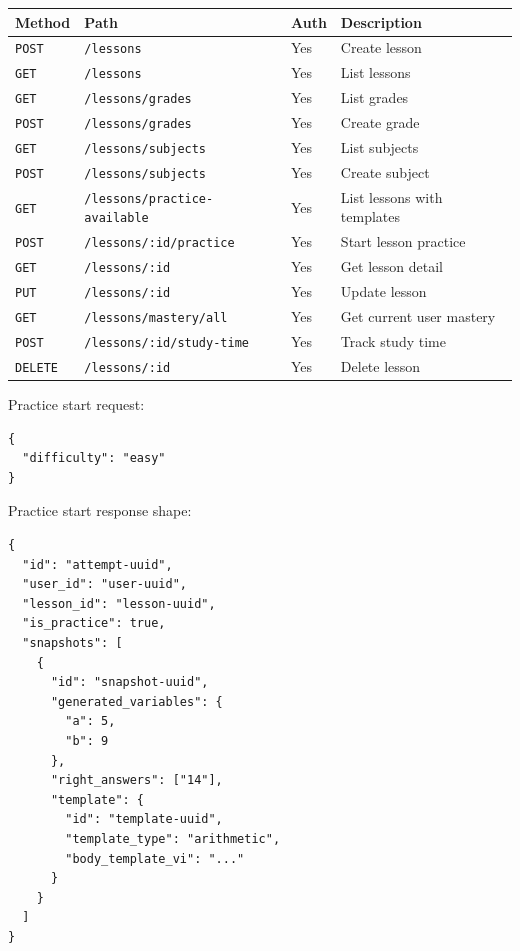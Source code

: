 \documentclass[11pt,a4paper]{article}
\newcommand{\docpath}[1]{\texttt{#1}}
\begin{document}
\begin{longtable}{L{0.12\textwidth}L{0.31\textwidth}L{0.12\textwidth}L{0.35\textwidth}}
\toprule
\textbf{Method} & \textbf{Path} & \textbf{Auth} & \textbf{Description} \\
\midrule
\endhead
\docpath{POST} & \docpath{/lessons} & Yes & Create lesson \\
\docpath{GET} & \docpath{/lessons} & Yes & List lessons \\
\docpath{GET} & \docpath{/lessons/grades} & Yes & List grades \\
\docpath{POST} & \docpath{/lessons/grades} & Yes & Create grade \\
\docpath{GET} & \docpath{/lessons/subjects} & Yes & List subjects \\
\docpath{POST} & \docpath{/lessons/subjects} & Yes & Create subject \\
\docpath{GET} & \docpath{/lessons/practice-available} & Yes & List lessons with templates \\
\docpath{POST} & \docpath{/lessons/:id/practice} & Yes & Start lesson practice \\
\docpath{GET} & \docpath{/lessons/:id} & Yes & Get lesson detail \\
\docpath{PUT} & \docpath{/lessons/:id} & Yes & Update lesson \\
\docpath{GET} & \docpath{/lessons/mastery/all} & Yes & Get current user mastery \\
\docpath{POST} & \docpath{/lessons/:id/study-time} & Yes & Track study time \\
\docpath{DELETE} & \docpath{/lessons/:id} & Yes & Delete lesson \\
\bottomrule
\end{longtable}

Practice start request:
\begin{lstlisting}[style=doccode]
{
  "difficulty": "easy"
}
\end{lstlisting}

Practice start response shape:
\begin{lstlisting}[style=doccode]
{
  "id": "attempt-uuid",
  "user_id": "user-uuid",
  "lesson_id": "lesson-uuid",
  "is_practice": true,
  "snapshots": [
    {
      "id": "snapshot-uuid",
      "generated_variables": {
        "a": 5,
        "b": 9
      },
      "right_answers": ["14"],
      "template": {
        "id": "template-uuid",
        "template_type": "arithmetic",
        "body_template_vi": "..."
      }
    }
  ]
}
\end{lstlisting}
\end{document}
